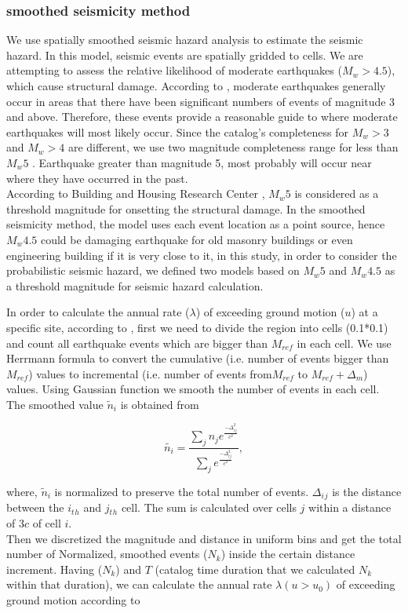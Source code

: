 \subsubsection{smoothed seismicity method}
We use spatially smoothed seismic hazard analysis \citep{Frankel1995} to estimate the seismic hazard. In this model, seismic events are spatially gridded to cells. We are attempting to assess the relative likelihood of moderate earthquakes ($M_w > 4.5$), which cause structural damage. According to \citet{Frankel1995}, moderate earthquakes generally occur in areas that there have been significant numbers of events of magnitude 3 and above. Therefore, these events provide a reasonable guide to where moderate earthquakes will most likely occur. Since the catalog's completeness for $M_w > 3$ and $M_w > 4$ are different, we use two magnitude completeness range for less than $M_w 5$ . Earthquake greater than magnitude 5, most probably will occur near where they have occurred in the past. \\
\noindent
According to Building and Housing Research Center  \citep{BHRC2014}, $M_w 5$ is considered as a threshold magnitude for onsetting the structural damage. In the smoothed seismicity method, the model uses each event location as a point source, hence $M_w 4.5$ could be damaging earthquake for old masonry buildings or even engineering building if it is very close to it, in this study, in order to consider the probabilistic seismic hazard, we defined two models based on $M_w 5$ and $M_w 4.5$ as a threshold magnitude for seismic hazard calculation. \\
\noindent

In order to calculate the annual rate ($\lambda$) of exceeding ground motion ($u$) at a specific site, according to \citet{Frankel1995}, first we need to divide the region into cells (0.1*0.1) and count all earthquake events which are bigger than $M_{ref}$ in each cell. We use Herrmann formula \citep{Herrmann1977} to convert the cumulative (i.e. number of events bigger than $M_{ref}$) values to incremental (i.e. number of events from$M_{ref}$ to $M_{ref}+\Delta_m$) values. Using Gaussian function we smooth the number of events in each cell. The smoothed value $\tilde{n}_i$ is obtained from

\begin{equation}
\tilde{n_i}=\frac{\sum_{j} n_{j} e^{\frac{-\Delta_{ij}^{2}}{c^2}}}{\sum_{j} e^{\frac{-\Delta_{ij}^{2}}{c^2}}},
\end{equation}

\noindent
where,  $\tilde{n}_i$  is normalized to preserve the total number of events. $\Delta{_i{_j}}$ is the distance between the $i{_t{_h}}$ and $j{_t{_h}}$ cell. The sum is calculated over cells $j$ within a distance of $3c$ of cell $i$.\\
\noindent
Then we discretized the magnitude and distance in uniform bins and get the total number of Normalized, smoothed events ($N_k$) inside the certain distance increment.
Having ($N_k$) and $T$ (catalog time duration that we calculated $N_k$ within that duration), we can calculate the annual rate  $\lambda (u> u_0 )$ of exceeding ground motion according to 

